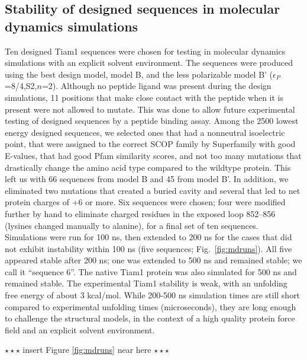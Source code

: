\documentclass[12pt]{article}
\begin{document}
\subsection{Stability of designed sequences in molecular dynamics simulations}
Ten designed Tiam1 sequences were chosen for testing in molecular dynamics simulations with an explicit solvent environment. The
sequences were produced using the best design model, model B, and the less polarizable model B' ($\epsilon_P$=8/4,S2,$n$=2). Although
no peptide ligand was present during the design simulations, 11 positions that make close contact with the peptide when it is present
were not allowed to mutate. This was done to allow future experimental testing of designed sequences by a peptide binding assay.
Among the 2500 lowest energy designed sequences, we selected ones that had a nonneutral isoelectric point, that were assigned to
the correct SCOP family by Superfamily with good E-values, that had good Pfam similarity scores, and not too many mutations that
drastically change the amino acid type compared to the wildtype protein. This left us with 66 sequences from model B and 45 from
model B'. In addition, we eliminated two mutations that created a buried cavity and several that led to net protein charges of +6
or more. Six sequences were chosen; four were modified further by hand to eliminate charged residues in the exposed loop 852--856
(lysines changed manually to alanine), for a final set of ten sequences. Simulations were run for 100 ns, then extended to 200 ns
for the cases that did not exhibit instability within 100 ns (five sequences; Fig.\ \ref{fig:mdruns}). All five appeared stable
after 200 ns; one was extended to 500 ns and remained stable; we call it ``sequence 6''. The native Tiam1 protein was also simulated
for 500 ns and remained stable. The experimental Tiam1 stability is weak, with an unfolding free energy of about 3 kcal/mol. While
200-500 ns simulation times are still short compared to experimental unfolding times (microseconds), they are long enough to challenge
the structural models, in the context of a high quality protein force field and an explicit solvent environment. 
\begin{center} $\star \star \star$ insert Figure \ref{fig:mdruns} near here $\star \star \star$ \end{center}
\end{document}
